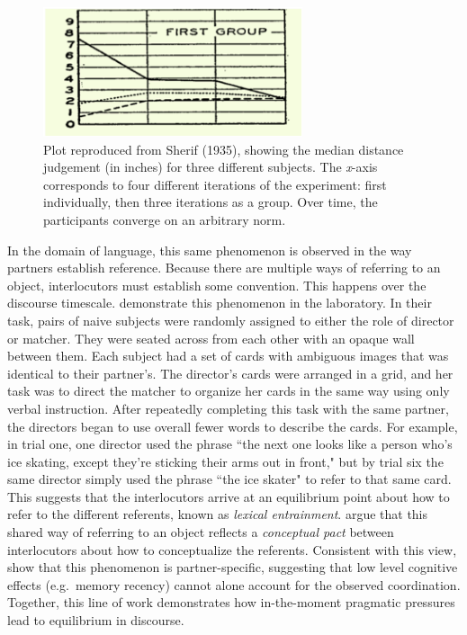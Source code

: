 \documentclass[man, noapacite, 12pt]{apa2}
\begin{document}
\begin{figure}
\begin{center} 
\includegraphics[width=3in]{figs/coordinatingmeaning.png}
\caption{\label{fig:results}  Plot reproduced from Sherif (1935), showing the median distance judgement (in inches) for three different subjects. The {\it x}-axis corresponds to four different iterations of the experiment: first individually, then three iterations as a group. Over time, the participants converge on an arbitrary norm.}
\end{center} 
\end{figure}

In the domain of language, this same phenomenon is observed in the way partners establish reference. Because there are multiple ways of referring to an object, interlocutors must establish some convention. This happens over the discourse timescale.  demonstrate this phenomenon in the laboratory. In their task, pairs of naive subjects were randomly assigned to either the role of director or matcher. They were seated across from each other with an opaque wall  between them. Each subject had a set of cards with ambiguous images that was identical to their partner's. The director's cards were arranged in a grid, and her task was to direct the matcher to organize her cards in the same way using only verbal instruction. After repeatedly completing this task with the same partner, the directors began to use overall fewer words to describe the cards. For example, in trial one, one director used the phrase ``the next one looks like a person who's ice skating, except they're sticking their arms out in front," but by trial six the same director simply used the phrase ``the ice skater" to refer to that same card. This suggests that the interlocutors arrive at an equilibrium point about how to refer to the different referents, known as {\it lexical entrainment}.  argue that this shared way of referring to an object reflects a {\it conceptual pact} between interlocutors about how to conceptualize the referents. Consistent with this view,  show that this phenomenon is partner-specific, suggesting that low level cognitive effects (e.g.\ memory recency) cannot alone account for the observed coordination. Together, this line of work demonstrates how in-the-moment pragmatic pressures lead to equilibrium in discourse.
\end{document}
